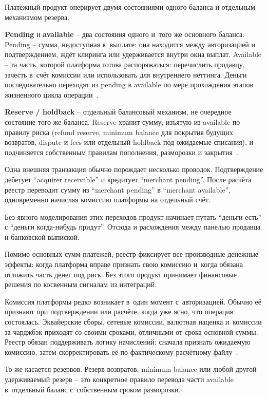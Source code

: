 Платёжный продукт оперирует двумя состояниями одного баланса
и отдельным механизмом резерва.

\textbf{Pending} и \textbf{available} -- два состояния одного и~того
же основного баланса. Pending -- сумма, недоступная к~выплате:
она находится между авторизацией и подтверждением, ждёт клиринга
или удерживается внутри окна выплат. Available -- та часть, которой
платформа готова распоряжаться: перечислить продавцу, зачесть
в~счёт комиссии или использовать для внутреннего неттинга. Деньги
последовательно переходят из pending в available по мере прохождения
этапов жизненного цикла операции~\cite{stripe-balances,adyen-balances}.

\textbf{Reserve / holdback} -- отдельный балансовый механизм,
не очередное состояние того же баланса. Reserve хранит сумму,
изъятую из available по правилу риска (refund reserve, minimum
balance для покрытия будущих возвратов, dispute и fees или
отдельный holdback под ожидаемые списания), и подчиняется собственным
правилам пополнения, разморозки и закрытия~\cite{stripe-balances,stripe-minimum-balances,adyen-balances}.

Одна внешняя транзакция обычно порождает несколько проводок.
Подтверждение дебетует \enquote{acquirer receivable} и кредитует
\enquote{merchant pending}. После расчёта реестр переводит сумму
из \enquote{merchant pending} в \enquote{merchant available},
одновременно начисляя комиссию платформы на отдельный счёт.

Без явного моделирования этих переходов продукт начинает путать
\enquote{деньги есть} с \enquote{деньги когда-нибудь придут}.
Отсюда и расхождения между панелью продавца и банковской выпиской.

Помимо основных сумм платежей, реестр фиксирует все производные
денежные эффекты: когда платформа вправе признать свою комиссию
и~когда обязана отложить часть денег под риск. Без этого продукт
принимает финансовые решения по косвенным сигналам из интеграций.

Комиссия платформы редко возникает в~один момент с~авторизацией.
Обычно её признают при подтверждении или расчёте, когда уже ясно,
что операция состоялась. Эквайерские сборы, сетевые комиссии, валютная
наценка и~комиссии за чарджбэк приходят со своими сроками, отличными
от срока основной суммы. Реестр обязан поддерживать логику начислений:
сначала признать ожидаемую комиссию, затем скорректировать её
по фактическому расчётному файлу~\cite{visa-core-rules,mc-tpr,stripe-balances}.

То же касается резервов. Резерв возвратов, minimum balance или любой
другой удерживаемый резерв -- это конкретное правило перевода части
available в~отдельный баланс с~собственным сроком разморозки.


